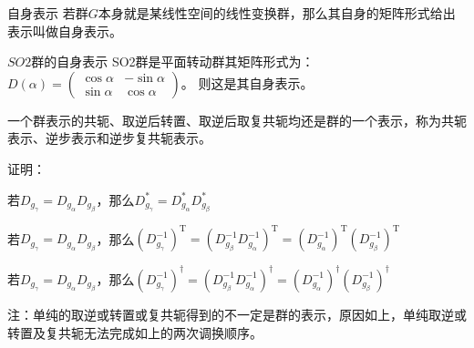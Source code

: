 \begin{definition}{自身表示}
若群$G$本身就是某线性空间的线性变换群，那么其自身的矩阵形式给出表示叫做自身表示。
\end{definition}
\begin{example}{$SO2$群的自身表示}
SO2群是平面转动群其矩阵形式为：$D(\alpha)=\begin{pmatrix}
 \cos{\alpha} & -\sin{\alpha}\\
 \sin{\alpha} & \cos{\alpha}
\end{pmatrix}$。
则这是其自身表示。
\end{example}

\begin{corollary}{}
一个群表示的共轭、取逆后转置、取逆后取复共轭均还是群的一个表示，称为共轭表示、逆步表示和逆步复共轭表示。
\end{corollary}

证明：

若$D_{g_\gamma}=D_{g_\alpha}D_{g_\beta}$，那么$D_{g_\gamma}^*=D_{g_\alpha}^*D_{g_\beta}^*$

若$D_{g_\gamma}=D_{g_\alpha}D_{g_\beta}$，那么$(D_{g_\gamma}^{-1})^\mathrm{T}=(D_{g_\beta}^{-1}D_{g_\alpha}^{-1})^\mathrm{T}=(D_{g_\alpha}^{-1})^\mathrm{T}(D_{g_\beta}^{-1})^\mathrm{T}$

若$D_{g_\gamma}=D_{g_\alpha}D_{g_\beta}$，那么$(D_{g_\gamma}^{-1})^\dagger=(D_{g_\beta}^{-1}D_{g_\alpha}^{-1})^\dagger=(D_{g_\alpha}^{-1})^\dagger(D_{g_\beta}^{-1})^\dagger$

注：单纯的取逆或转置或复共轭得到的不一定是群的表示，原因如上，单纯取逆或转置及复共轭无法完成如上的两次调换顺序。